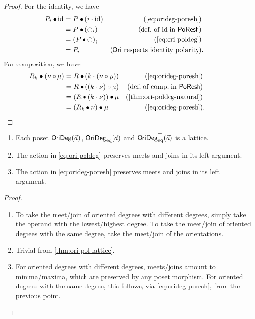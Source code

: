 \documentclass[a4paper]{memoir}
\begin{document}
\begin{proof}
	For the identity, we have
	\begin{align*}
		\odeg P i \oriof \id
		&= P \oriof (i \cdot \id)
		& \text{(\cref{eq:orideg-poresh})} \\
		&= P \oriof (\pdeg \pospol i)
		& \text{(def.\ of $\id$ in $\poreshcat$)} \\
		&= \odeg{(P \oriof \pospol)}{i}
		& \text{(\cref{eq:ori-poldeg})} \\
		&= \odeg P i
		& \text{($\oripsh$ respects identity polarity)} &.
	\end{align*}
	For composition, we have
	\begin{align*}
		\odeg R k \oriof (\nu \circ \mu)
		&= R \oriof (k \cdot (\nu \circ \mu))
		& \text{(\cref{eq:orideg-poresh})} \\
		&= R \oriof ((k \cdot \nu) \circ \mu)
		& \text{(def.\ of comp.\ in $\poreshcat$)} \\
		&= (R \oriof (k \cdot \nu)) \oriof \mu 
		& \text{(\cref{thm:ori-poldeg-natural})} \\
		&= (\odeg R k \oriof \nu) \oriof \mu 
		& \text{(\cref{eq:orideg-poresh})} &. \qquad \qedhere
	\end{align*}
\end{proof}
\begin{proposition}
	\label{thm:orideg-lattice}
	\label{thm:ori-poldeg-lattice}
	\label{thm:orideg-poresh-lattice}
	\begin{enumerate}
		\item Each poset $\mathsf{OriDeg}(\vec a)$, $\mathsf{OriDeg}_{\mathrm{eq}}(\vec a)$ and $\mathsf{OriDeg}_{\mathrm{eq}}^\top(\vec a)$ is a lattice.
		\item The action in \cref{eq:ori-poldeg} preserves meets and joins in its left argument.
		\item The action in \cref{eq:orideg-poresh} preserves meets and joins in its left argument.
	\end{enumerate}
\end{proposition}
\begin{proof}
	\begin{enumerate}
		\item To take the meet/join of oriented degrees with different degrees, simply take the operand with the lowest/highest degree. To take the meet/join of oriented degrees with the same degree, take the meet/join of the orientations.
		\item Trivial from \cref{thm:ori-pol-lattice}.
		\item For oriented degrees with different degrees, meets/joins amount to minima/maxima, which are preserved by any poset morphism. For oriented degrees with the same degree, this follows, via \cref{eq:orideg-poresh}, from the previous point. \qedhere
	\end{enumerate}
\end{proof}
\end{document}
